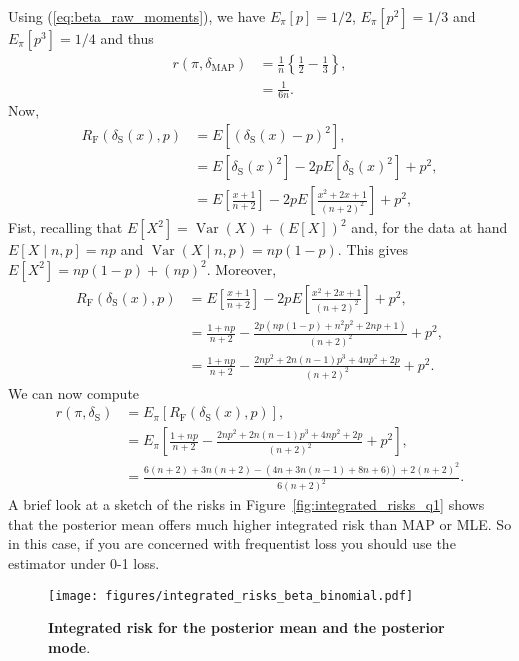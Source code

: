 \documentclass[a4paper,10pt, notitlepage]{report}
\newcommand{\vr}{\operatorname{Var}} %
\begin{document}
{\begin{equation*}
\end{equation*}
Using (\ref{eq:beta_raw_moments}), we have  $E_{\pi}[p] = 1/2$, $E_{\pi}[p^2]= 1/3$ and $E_{\pi}[p^3]= 1/4$ and thus
\begin{align*}
  r(\pi, \delta_{\text{MAP}}) &= \frac{1}{n} \left\{\frac{1}{2} - \frac{1}{3}\right\},\\
  &= \frac{1}{6n}.
\end{align*}
Now, 
\begin{align*}
 R_{\text{F}}(\delta_{\text{S}}(x), p) &= E\left[\left(\delta_{\text{S}}(x)-p\right)^2\right],\\
 &= E\left[\delta_{\text{S}}(x)^2\right] - 2pE\left[\delta_{\text{S}}(x)^2\right] + p^2,\\
 &= E\left[\frac{x+1}{n+2}\right] - 2pE\left[\frac{x^2 + 2x + 1}{(n+2)^2}\right] + p^2,
\end{align*}
Fist, recalling that $E[X^2] = \vr(X) + (E[X])^2$ and, for the data at hand $E[X \mid n,  p] = np$ and $\vr(X \mid n, p) = np(1-p)$.
This gives $E[X^2] = np(1-p) + (np)^2$.
Moreover,
\begin{align*}
 R_{\text{F}}(\delta_{\text{S}}(x), p) &= E\left[\frac{x+1}{n+2}\right] - 2pE\left[\frac{x^2 + 2x + 1}{(n+2)^2}\right] + p^2,\\
 &=  \frac{1 + np}{n+2} - \frac{2p\left(np(1-p) + n^2p^2 + 2np+ 1\right)}{(n+2)^2} + p^2,\\
 &=  \frac{1 + np}{n+2} - \frac{2np^2 + 2n(n-1)p^3 + 4np^2 + 2p}{(n+2)^2} + p^2. 
\end{align*}
We can now compute
\begin{align*}
 r(\pi, \delta_{\text{S}}) &= E_\pi\left[ R_{\text{F}}(\delta_{\text{S}}(x), p)\right],\\
  &= E_\pi\left[ \frac{1 + np}{n+2} - \frac{2np^2 + 2n(n-1)p^3 + 4np^2 + 2p}{(n+2)^2} + p^2\right],\\
 &= \frac{6(n+2) + 3n(n+2) - \left(4n + 3n(n-1) + 8n +6)\right) + 2(n+2)^2}{6(n+2)^2}.
\end{align*}
A brief look at a sketch of the risks in Figure~\ref{fig:integrated_risks_q1} shows that the posterior mean offers much higher integrated risk than MAP or MLE.
So in this case, if you are concerned with frequentist loss you should use the estimator under 0-1 loss.
\begin{figure}[!ht]
\begin{center}
 \texttt{[image: figures/integrated\_risks\_beta\_binomial.pdf]}
\end{center} 
\caption{\textbf{Integrated risk for the posterior mean and the posterior mode}.
}
\end{figure}}
\end{document}
